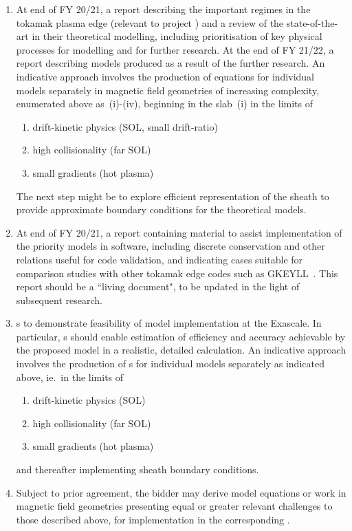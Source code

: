 \begin{enumerate}
\item At end of FY 20/21, a report describing the important regimes in the 
tokamak plasma edge (relevant to project \nep) and a review of the 
state-of-the-art in their theoretical modelling, including prioritisation of 
key physical processes for modelling and for further research. At the end of FY 
21/22, a report describing models produced as a result of the further research.
An indicative approach involves the production of equations for
individual models separately in magnetic field geometries of increasing complexity, 
enumerated above as~(i)-(iv), beginning in the slab~(i) in the limits of
\begin{enumerate}
\item drift-kinetic physics (SOL, small drift-ratio)
\item high collisionality (far SOL)
\item small gradients (hot plasma)
\end{enumerate}
The next step might be to explore efficient
representation of the sheath to provide approximate boundary
conditions for the theoretical  models.
\item At end of  FY 20/21, a report containing material to assist implementation of the priority 
models in software, including discrete conservation and other relations useful for code 
validation, and indicating cases suitable for comparison studies with other 
tokamak edge codes such as GKEYLL~\cite{Sh19Full}. This report should be a ``living document",
to be updated in the light of subsequent research.
\item \Papp s to demonstrate feasibility of model implementation at the Exascale. 
In particular, \papp s should enable estimation of efficiency and accuracy achievable by the 
proposed model in a realistic, detailed calculation.
An indicative approach involves the production of \papp s for 
individual models separately as indicated above, ie.\ in the limits of
\begin{enumerate}
\item drift-kinetic physics (SOL)
\item high collisionality (far SOL)
\item small gradients (hot plasma)
\end{enumerate}
and thereafter implementing sheath boundary conditions.
\item Subject to prior agreement, the bidder may derive model equations
or work in magnetic field geometries
presenting equal or greater relevant challenges to those described above,
for implementation in the corresponding \papp.
\end{enumerate}

